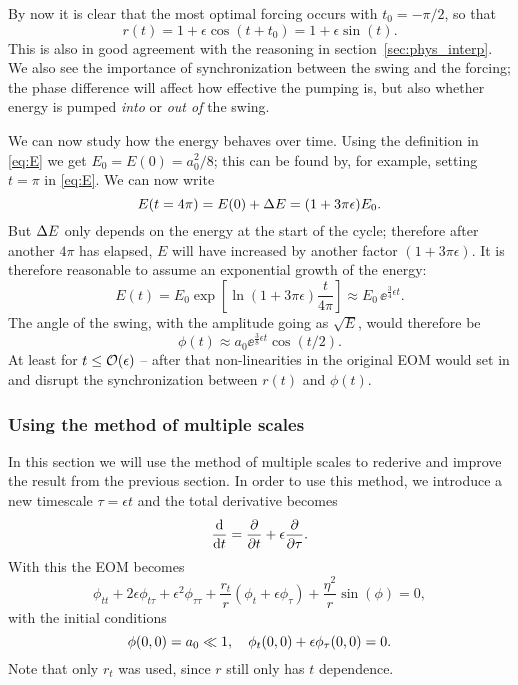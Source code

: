 \documentclass[10pt,letter, swedish, english,%
]{article}
\begin{document}
By now it is clear that the most optimal forcing occurs with
$t_0=-\pi/2$, so that
\begin{equation}\label{eq:r}
r(t)=1+\epsilon\cos(t+t_0)=1+\epsilon\sin(t).
\end{equation}
This is also in good agreement with the reasoning in
section~\ref{sec:phys_interp}. We also see the importance of
synchronization between the swing and the forcing; the phase
difference will affect how effective the pumping is, but also whether
energy is pumped \emph{into} or \emph{out of} the swing.

We can now study how the energy behaves over time. Using the
definition in \eqref{eq:E} we get $E_0=E(0)=a_0^2/8$; this can be
found by, for example, setting $t=\pi$ in \eqref{eq:E}. We can now write
\begin{equation}\label{eq:E(4pi)}
E(t=4\pi)=E(0)+\Delta{E}=(1+3\pi\epsilon)E_0.
\end{equation}
But $\Delta{E}$ only depends on the energy at the start of the cycle;
therefore after another $4\pi$ has elapsed, $E$ will have increased by
another factor $(1+3\pi\epsilon)$. 
It is therefore reasonable to assume an exponential growth of the
energy: 
\begin{equation}\label{eq:E(t)}
E(t)=E_0\exp[\ln(1+3\pi\epsilon)\frac{t}{4\pi}]
\approx E_0\,\ee^{\frac{3}{4}\epsilon t}.
\end{equation}
The angle of the swing, with the amplitude going as
$\sqrt{E}$, would therefore be 
\begin{equation}\label{eq:phi_from_E}
\phi(t)\approx a_0\ee^{\frac{3}{8}\epsilon t}\cos(t/2).
\end{equation}
At least for $t\le\order{\epsilon}$ -- after that non-linearities in the
original EOM would set in and disrupt the synchronization between $r(t)$ and
$\phi(t)$. 



\subsubsection{Using the method of multiple scales}

In this section we will use the method of multiple scales to
rederive and improve the result from the previous section. In order to
use this method, we introduce a new timescale $\tau=\epsilon{t}$ and
the total derivative becomes
\begin{equation}
\dv{t}=\pdv{t}+\epsilon\pdv{\tau}.
\end{equation}
With this the EOM becomes
\begin{equation}\label{eq:eom_mms}
\phi_{tt}+2\epsilon\phi_{t\tau}+\epsilon^2\phi_{\tau\tau}
+\frac{r_t}{r}(\phi_t+\epsilon\phi_\tau)+\frac{\eta^2}{r}\sin(\phi)=0,
\end{equation}
with the initial conditions 
\begin{equation}\label{eq:inti_mms}
\phi(0, 0)=a_0\ll1\qcomma
\phi_t(0, 0)+\epsilon\phi_\tau(0, 0)=0.
\end{equation} 
Note that only $r_t$ was used, since $r$ still only has $t$
dependence. 
\end{document}
